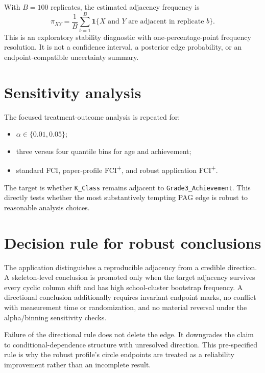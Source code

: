 \documentclass[11pt,a4paper,oneside]{report}
\newcommand{\FCIplus}{FCI\textsuperscript{+}}
\newcommand{\code}[1]{\texttt{#1}}
\begin{document}
With \(B=100\) replicates, the estimated adjacency frequency is
\[
  \widehat{\pi}_{XY}
  = \frac{1}{B}\sum_{b=1}^{B}
    \mathbf{1}\{X\text{ and }Y\text{ are adjacent in replicate }b\}.
\]
This is an exploratory stability diagnostic with one-percentage-point
frequency resolution. It is not a confidence interval, a posterior edge
probability, or an endpoint-compatible uncertainty summary.

\section{Sensitivity analysis}

\enlargethispage{3\baselineskip}

The focused treatment-outcome analysis is repeated for:

\begin{itemize}[leftmargin=2em]
  \item \(\alpha\in\{0.01,0.05\}\);
  \item three versus four quantile bins for age and achievement;
  \item standard FCI, paper-profile \FCIplus{}, and robust application
        \FCIplus{}.
\end{itemize}

The target is whether \code{K\_Class} remains adjacent to
\code{Grade3\_Achievement}. This directly tests whether the most
substantively tempting PAG edge is robust to reasonable analysis choices.

\section{Decision rule for robust conclusions}

The application distinguishes a reproducible adjacency from a credible
direction. A skeleton-level conclusion is promoted only when the target
adjacency survives every cyclic column shift and has high school-cluster
bootstrap frequency. A directional conclusion additionally requires invariant
endpoint marks, no conflict with measurement time or randomization, and no
material reversal under the alpha/binning sensitivity checks.

Failure of the directional rule does not delete the edge. It downgrades the
claim to conditional-dependence structure with unresolved direction. This
pre-specified rule is why the robust profile's circle endpoints are treated as
a reliability improvement rather than an incomplete result.
\end{document}
